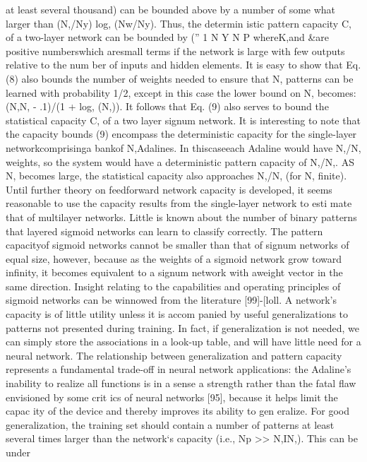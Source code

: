 \documentclass[11pt,a4paper,twocolumn]{article}
\begin{document}
at least several 
thousand) can be bounded above by a number of some
what larger than (N,/Ny) log, (Nw/Ny). Thus, the determin
istic pattern capacity C, 
of a two-layer network can be 
bounded by 
(” 
1 
N Y N P  
whereK,and \&are positive numberswhich aresmall terms 
if the network is large with few outputs relative to the num
ber of inputs and hidden elements. 
It is easy to show that Eq. (8) also bounds the number of 
weights needed to ensure that N, patterns can be learned 
with probability 1/2, except in this case the lower bound on 
N, 
becomes: (N,N, - .1)/(1 + log, (N,)). 
It follows that Eq. 
(9) also serves to bound the statistical capacity C, of a two
layer signum network. 
It is interesting to note that the capacity bounds (9) 
encompass the deterministic capacity for the single-layer 
networkcomprisinga bankof N,Adalines. In thiscaseeach 
Adaline would have N,/N, 
weights, so the system would 
have a deterministic pattern capacity of N,/N,. 
AS N, 
becomes large, the statistical capacity also approaches 
N,/N, 
(for N, finite). Until further theory on feedforward 
network capacity is developed, it seems reasonable to use 
the capacity results from the single-layer network to esti
mate that of multilayer networks. 
Little is known about the number of binary patterns that 
layered sigmoid networks can learn to classify correctly. 
The pattern capacityof sigmoid networks cannot be smaller 
than that of signum networks of equal size, however, 
because as the weights of a sigmoid network grow toward 
infinity, it becomes equivalent to a signum network with 
aweight vector in the same direction. Insight relating to the 
capabilities and operating principles of sigmoid networks 
can be winnowed from the literature [99]-[loll. 
A network’s capacity is of little utility unless it is accom
panied by useful generalizations to patterns not presented 
during training. In fact, if generalization is not needed, we 
can simply store the associations in a look-up table, and will 
have little need for a neural network. The relationship 
between generalization and pattern capacity represents a 
fundamental trade-off in neural network applications: 
the Adaline’s inability to realize all functions is in a sense 
a strength rather than the fatal flaw envisioned by some crit
ics of neural networks [95], because it helps limit the capac
ity of the device and thereby improves its ability to gen
eralize. 
For good generalization, the training set should contain 
a number of patterns at least several times larger than the 
network‘s capacity (i.e., Np >> N,IN,). 
This can be under
\end{document}
